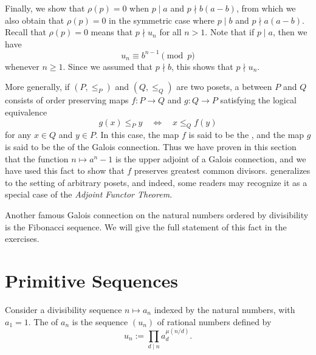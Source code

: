 \begin{example}
  Finally, we show that $\rho(p)=0$ when $p\mid a$ and $p\nmid b(a-b)$, from which we also obtain that $\rho(p)=0$ in the symmetric case where $p\mid b$ and $p\nmid a(a-b)$. Recall that $\rho(p)=0$ means that $p\nmid u_n$ for all $n>1$. Note that if $p\mid a$, then we have
  \begin{equation*}
    u_n\equiv b^{n-1}\pmod{p}
  \end{equation*}
  whenever $n\geq 1$. Since we assumed that $p\nmid b$, this shows that $p\nmid u_n$.
\end{example}

\begin{remark}
  More generally, if $(P,\leq_P)$ and $(Q,\leq_Q)$ are two posets, a  between $P$ and $Q$ consists of order preserving maps $f:P\to Q$ and $g:Q\to P$ satisfying the logical equivalence
  \begin{equation*}
    g(x)\leq_P y \quad\Leftrightarrow\quad x\leq_Q f(y)
  \end{equation*}
  for any $x\in Q$ and $y\in P$. In this case, the map $f$ is said to be the , and the map $g$ is said to be the  of the Galois connection. Thus we have proven in this section that the function $n\mapsto a^n-1$ is the upper adjoint of a Galois connection, and we have used this fact to show that $f$ preserves greatest common divisors.  generalizes to the setting of arbitrary posets, and indeed, some readers may recognize it as a special case of the \emph{Adjoint Functor Theorem}.

  Another famous Galois connection on the natural numbers ordered by divisibility is the Fibonacci sequence. We will give the full statement of this fact in the exercises.
\end{remark}

\section{Primitive Sequences}

\begin{definition}
  Consider a divisibility sequence $n\mapsto a_n$ indexed by the natural numbers, with $a_1=1$. The  of $a_n$ is the sequence $(u_n)$ of rational numbers defined by
  \begin{equation*}
    u_n:=\prod_{d\mid n}a_d^{\mu(n/d)}.
  \end{equation*}
\end{definition}

